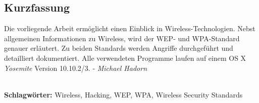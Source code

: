 
\subsection*{Kurzfassung}
Die vorliegende Arbeit ermöglicht einen Einblick in Wireless-Technologien.
Nebst allgemeinen Informationen zu Wireless, wird der WEP- und WPA-Standard genauer erläutert.
Zu beiden Standards werden Angriffe durchgeführt und detailliert dokumentiert.
Alle verwendeten Programme laufen auf einem OS X \textit{Yosemite} Version 10.10.2/3.
 - \textit{Michael Hadorn}


%
\mbox{}\\[0.5\baselineskip]\noindent
\textbf{Schlagwörter:} 
Wireless, Hacking, WEP, WPA, Wireless Security Standards
